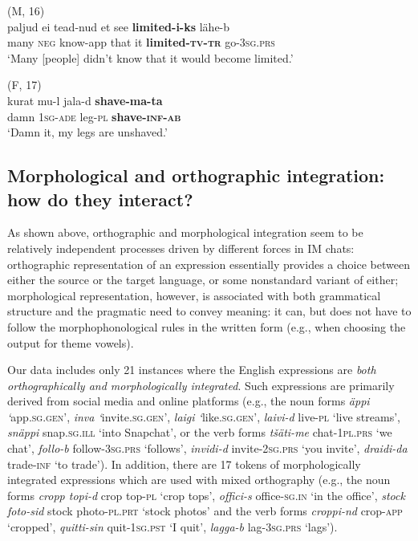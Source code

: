\documentclass[output=paper]{langscibook}
\begin{document}
\ex  (M, 16)\\ \label{ex:vihmanetal:15b}
\gll paljud   ei  tead-nud   et  see  \textbf{{limited-i-ks}}   lähe-b\\
   many   \textsc{neg}  know{}-app   that   it   \textbf{limited{}-}\textbf{\textsc{tv-tr}} go{}-3\textsc{sg.prs}\\
\glt  ‘Many [people] didn’t know that it would become limited.’

\ex  (F, 17)\\ \label{ex:vihmanetal:15c}
\gll kurat  mu-l    jala-d \textbf{{shave-ma-ta}  }\\
damn  1\textsc{sg-ade}  leg{}-\textsc{pl}    \textbf{shave{}-}\textbf{\textsc{inf-ab}}\\
\glt ‘Damn it, my legs are unshaved.’
    \z
\z


\subsection{Morphological and orthographic integration: how do they interact?}\label{sec:vihmanetal:4.4}

As shown above, orthographic and morphological integration seem to be relatively independent processes driven by different forces in IM chats: orthographic representation of an expression essentially provides a choice between either the source or the target language, or some nonstandard variant of either; morphological representation, however, is associated with both grammatical structure and the pragmatic need to convey meaning: it can, but does not have to follow the morphophonological rules in the written form (e.g., when choosing the output for theme vowels).

Our data includes only 21 instances where the English expressions are \textit{both orthographically and morphologically integrated}. Such expressions are primarily derived from social media and online platforms (e.g., the noun forms \textit{äppi ‘}app.\textsc{sg.gen}’, \textit{inva ‘}invite.\textsc{sg.gen}’, \textit{laigi ‘}like.\textsc{sg.gen}’, \textit{laivi-d} live{}-\textsc{pl} ‘live streams’, \textit{snäppi} snap.\textsc{sg.ill} ‘into Snapchat’, or the verb forms \textit{tšäti-me} chat{}-1\textsc{pl.prs} ‘we chat’, \textit{follo-b} follow{}-3\textsc{sg.prs} ‘follows’, \textit{invidi-d} invite{}-2\textsc{sg.prs} ‘you invite’, \textit{draidi-da} trade{}-\textsc{inf} ‘to trade’). In addition, there are 17 tokens of morphologically integrated expressions which are used with mixed orthography (e.g., the noun forms \textit{cropp topi-d} crop top{}-\textsc{pl} ‘crop tops’, \textit{offici-s} office{}-\textsc{sg.in} ‘in the office’, \textit{stock foto-sid} stock photo{}-\textsc{pl.prt} ‘stock photos’ and the verb forms \textit{croppi-nd} crop{}-\textsc{app} ‘cropped’, \textit{quitti-sin} quit{}-1\textsc{sg.pst} ‘I quit’, \textit{lagga-b} lag{}-3\textsc{sg.prs} ‘lags’).
\end{document}
